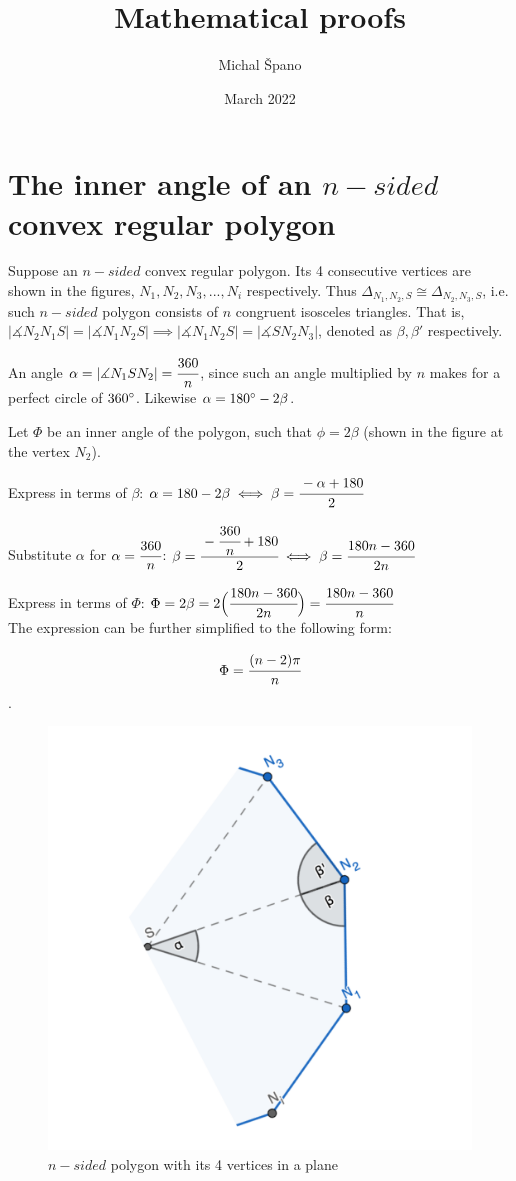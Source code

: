 \documentclass[10pt,a4paper]{article}
\title{\textbf{Mathematical proofs}}
\author{Michal Špano}
\date{March 2022}
\begin{document}
\maketitle

\section{The inner angle of an $n-sided$ convex regular polygon}

Suppose an $n-sided$ convex regular polygon. Its 4 consecutive vertices are shown in the figures, $N_1, N_2, N_3, ..., N_i$ respectively. 
Thus $\Delta_{N_1,N_2,S} \cong \Delta_{N_2,N_3,S}$, i.e. such $n-sided$ polygon consists of $n$ congruent isosceles triangles. 
That is, $|\measuredangle N_2 N_1 S| = |\measuredangle N_1 N_2 S| \implies |\measuredangle N_1 N_2 S| = |\measuredangle S N_2 N_3|$, denoted as $\beta, \beta'$ respectively. 

An angle $\alpha = |\measuredangle N_1 S N_2| = \cfrac{360}{n}$, since such an angle multiplied by $n$ makes for a perfect circle of $360\degree$. Likewise $\alpha = 180\degree - 2 \beta$.

Let $\Phi$ be an inner angle of the polygon, such that $\phi = 2 \beta$ (shown in the figure at the vertex $N_2$).

Express in terms of $\beta$: $\alpha = 180 - 2 \beta \iff \beta = \cfrac{-\alpha + 180}{2}$

Substitute $\alpha$ for $\alpha = \cfrac{360}{n}$: $\beta = \cfrac{-\cfrac{360}{n} + 180}{2} \iff \beta = \cfrac{180n - 360}{2n}$

Express in terms of $\Phi$: $\Phi = 2 \beta = 2 \Big( \cfrac{180n - 360}{2n} \Big) = \cfrac{180n - 360}{n}$ \\

The expression can be further simplified to the following form:

$$\Phi = \cfrac{(n-2) \pi}{n}$$.

\begin{figure}[htp]
    \centering
    \includegraphics[width=4.cm]{polygon_export.png}
    \caption{$n-sided$ polygon with its 4 vertices in a plane}
\end{figure}
\end{document}
